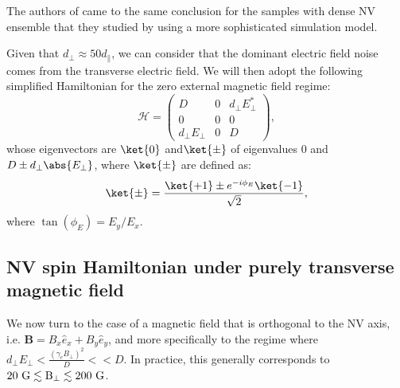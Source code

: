 \documentclass[a4paper,11pt]{report}
\begin{document}
The authors of \citep{mittiga2018imaging} came to the same conclusion for the samples with dense NV ensemble that they studied by using a more sophisticated simulation model.


Given that $d_\perp \approx 50 d_\parallel$, we can consider that the dominant electric field noise comes from the transverse electric field. We will then adopt the following simplified Hamiltonian for the zero external magnetic field regime:
\begin{equation}
\mathcal{H}=\begin{pmatrix}
D&0&d_\perp E_\perp^* \\
0&0&0 \\
d_\perp E_\perp &0&D
\end{pmatrix},
\end{equation}
whose eigenvectors are $\ket{0}$ and$\ket{\pm}$ of eigenvalues 0 and $D\pm d_\perp \abs{E_\perp}$, where $\ket{\pm}$ are defined as:
\begin{equation}
\ket{\pm}=\frac{\ket{+1}\pm e^{-i\phi_E}\ket{-1}}{\sqrt{2}},
\end{equation}
where $\tan(\phi_E)=E_y/E_x$.

\subsection{NV spin Hamiltonian under purely transverse magnetic field}
\label{sec B transverse}

We now turn to the case of a magnetic field that is orthogonal to the NV axis, i.e. $\mathbf{B}=B_x \hat{e}_x + B_y \hat e_y$, and more specifically to the regime where $d_\perp E_\perp < \frac{(\gamma_e B_\perp)^2}{D} << D$. In practice, this generally corresponds to $20\ \rm G \lesssim B_\perp \lesssim 200\ \rm G$.
\end{document}
